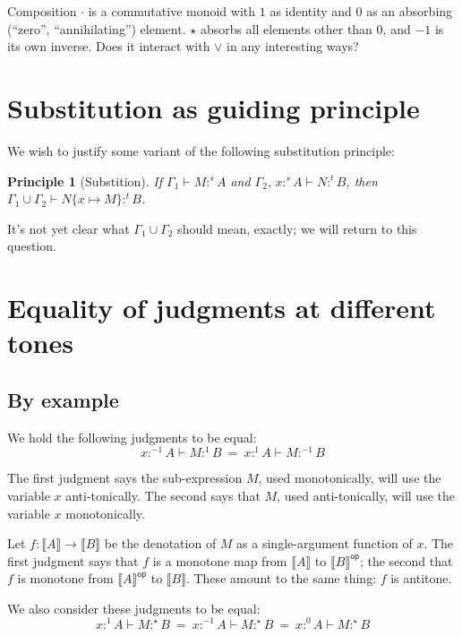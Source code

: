 \documentclass{article}
\newtheorem{principle}{Principle}
\newcommand{\todo}[1]{{\color{red}#1}}
\newcommand{\ms}[1]{\ensuremath{\mathsf{#1}}}
\newcommand{\GG}{\Gamma}
\newcommand{\sub}[1]{\{{#1}\}}
\newcommand{\den}[1]{\llbracket{#1}\rrbracket}
\newcommand{\tm}{\ensuremath{1}}     %
\newcommand{\ta}{\ensuremath{-1}}    %
\newcommand{\ti}{\ensuremath{\star}} %
\newcommand{\tb}{\ensuremath{0}}     %
\newcommand{\tc}{\cdot}         %
\newcommand{\h}[3]{#1 :^{#3}\! {#2}}
\newcommand{\hm}[2]{\h{#1}{#2}{\tm}}
\newcommand{\ha}[2]{\h{#1}{#2}{\ta}}
\newcommand{\hi}[2]{\h{#1}{#2}{\ti}}
\newcommand{\hb}[2]{\h{#1}{#2}{\tb}}
\begin{document}
Composition $\tc$ is a commutative monoid with $\tm$ as identity and $\tb$ as
an absorbing (``zero'', ``annihilating'') element. $\ti$ absorbs all elements
other than $\tb$, and $\ta$ is its own inverse. \todo{Does it interact with
  $\vee$ in any interesting ways?}


\section{Substitution as guiding principle}

We wish to justify some variant of the following substitution principle:

\begin{principle}[Substition]
  If $\GG_1 \vdash \h{M}{A}{s}$ and $\GG_2,\, \h{x}{A}{s} \vdash \h{N}{B}{t}$,
  then \(\GG_1 \cup \GG_2 \vdash \h{N\sub{x \mapsto M}}{B}{t}\).
\end{principle}

It's not yet clear what $\GG_1 \cup \GG_2$ should mean, exactly; \todo{we will
  return to this question.}


\section{Equality of judgments at different tones}

\subsection{By example}

We hold the following judgments to be equal:
\begin{equation}\label{eqn:ex1}
 \ha{x}{A} \vdash \hm{M}{B} ~=~ \hm{x}{A} \vdash \ha{M}{B}
\end{equation}

The first judgment says the sub-expression $M$, used monotonically, will use the
variable $x$ anti-tonically. The second says that $M$, used anti-tonically, will
use the variable $x$ monotonically.

Let $f : \den{A} \to \den{B}$ be the denotation of $M$ as a single-argument
function of $x$. The first judgment says that $f$ is a monotone map from
$\den{A}$ to $\den{B}^{\ms{op}}$; the second that $f$ is monotone from
$\den{A}^{\ms{op}}$ to $\den{B}$. These amount to the same thing: $f$ is
antitone.

We also consider these judgments to be equal:
\begin{equation}
  \hm{x}{A} \vdash \hi{M}{B}
  ~=~
  \ha{x}{A} \vdash \hi{M}{B}
  ~=~
  \hb{x}{A} \vdash \hi{M}{B}
\end{equation}
\end{document}
